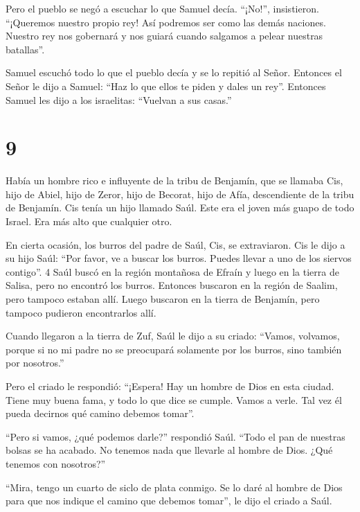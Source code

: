  Pero el pueblo se negó a escuchar lo que Samuel decía.
``¡No!'', insistieron. ``¡Queremos nuestro propio rey!  Así
podremos ser como las demás naciones. Nuestro rey nos gobernará y nos
guiará cuando salgamos a pelear nuestras batallas''.

 Samuel escuchó todo lo que el pueblo decía y se lo repitió
al Señor.  Entonces el Señor le dijo a Samuel: ``Haz lo que
ellos te piden y dales un rey''. Entonces Samuel les dijo a los
israelitas: ``Vuelvan a sus casas.''

\hypertarget{section-8}{%
\section{9}\label{section-8}}

 Había un hombre rico e influyente de la tribu de Benjamín,
que se llamaba Cis, hijo de Abiel, hijo de Zeror, hijo de Becorat, hijo
de Afía, descendiente de la tribu de Benjamín.  Cis tenía un
hijo llamado Saúl. Este era el joven más guapo de todo Israel. Era más
alto que cualquier otro.

 En cierta ocasión, los burros del padre de Saúl, Cis, se
extraviaron. Cis le dijo a su hijo Saúl: ``Por favor, ve a buscar los
burros. Puedes llevar a uno de los siervos contigo''. 4 Saúl buscó en la
región montañosa de Efraín y luego en la tierra de Salisa, pero no
encontró los burros. Entonces buscaron en la región de Saalim, pero
tampoco estaban allí. Luego buscaron en la tierra de Benjamín, pero
tampoco pudieron encontrarlos allí.

 Cuando llegaron a la tierra de Zuf, Saúl le dijo a su
criado: ``Vamos, volvamos, porque si no mi padre no se preocupará
solamente por los burros, sino también por nosotros.''

 Pero el criado le respondió: ``¡Espera! Hay un hombre de
Dios en esta ciudad. Tiene muy buena fama, y todo lo que dice se cumple.
Vamos a verle. Tal vez él pueda decirnos qué camino debemos tomar''.

 ``Pero si vamos, ¿qué podemos darle?'' respondió Saúl.
``Todo el pan de nuestras bolsas se ha acabado. No tenemos nada que
llevarle al hombre de Dios. ¿Qué tenemos con nosotros?''

 ``Mira, tengo un cuarto de siclo de plata conmigo. Se lo
daré al hombre de Dios para que nos indique el camino que debemos
tomar'', le dijo el criado a Saúl.


